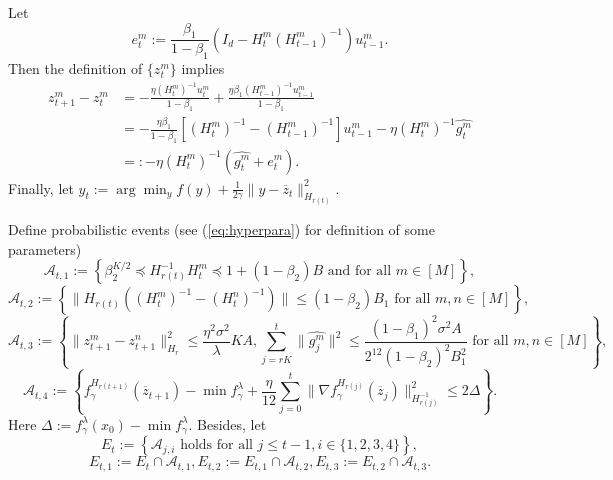 \documentclass{article} %
\numberwithin{equation}{section}
\renewcommand{\eqref}[1]{(\ref{#1})}
\begin{document}
    Let 
    \begin{equation}\label{eq:def_e}
        e_t^m:=\frac{\beta_1}{1-\beta_1}(I_d-H_t^m(H_{t-1}^m)^{-1})u_{t-1}^m.
    \end{equation}
    Then the definition of $\{z_t^m\}$ implies 
    \begin{equation}\label{eq:diff_zt}
        \begin{aligned}
            z_{t+1}^m-z_t^m 
            & = -\frac{\eta(H_t^m)^{-1}u_t^m}{1-\beta_1} + \frac{\eta\beta_1(H_{t-1}^m)^{-1}u_{t-1}^m}{1-\beta_1} \\
            & = -\frac{\eta\beta_1}{1-\beta_1}[(H_t^m)^{-1}-(H_{t-1}^m)^{-1}]u_{t-1}^m - \eta (H_t^m)^{-1}\widehat{g_t^m} \\
            & =: -\eta (H_t^m)^{-1}(\widehat{g_t^m}+e_t^m).
        \end{aligned}
    \end{equation}
    Finally, let $y_t:=\arg\min_y f(y) + \frac{1}{2\gamma}\|y-\overline{z}_t\|_{H_{r(t)}}^2$.
    
    Define probabilistic events (see \eqref{eq:hyperpara} for definition of some parameters)
    \begin{equation}
        \mathcal{A}_{t,1}:=\left\{ \beta_2^{K/2} \preceq H_{r(t)}^{-1}H_t^m \preceq 1+(1-\beta_2)B \text{ and for all }m\in [M] \right\},
    \end{equation}
    \begin{equation}
        \mathcal{A}_{t,2}:=\left\{ \|H_{r(t)}((H_t^m)^{-1}-(H_t^n)^{-1})\|\leq (1-\beta_2)B_1 \text{ for all }m,n\in [M] \right\},
    \end{equation}
    \begin{equation}
        \mathcal{A}_{t,3}:=\left\{ \|z_{t+1}^m-z_{t+1}^n\|_{H_r}^2 \leq \frac{\eta^2\sigma^2}{\lambda}KA, \sum_{j=rK}^{t}\|\widehat{g_j^m}\|^2\leq \frac{(1-\beta_1)^2\sigma^2A}{2^{12}(1-\beta_2)^2B_1^2} \text{ for all } m,n\in [M] \right\},
    \end{equation}
    \begin{equation}
        \mathcal{A}_{t,4}:=\left\{ f_\gamma^{H_{r(t+1)}}(\overline{z}_{t+1}) - \min f_\gamma^\lambda+\frac{\eta}{12}\sum_{j=0}^t\|\nabla f_\gamma^{H_{r(j)}}(\overline{z}_j)\|_{H_{r(j)}^{-1}}^2 \leq 2\Delta \right\}.
    \end{equation}
    Here $\Delta:= f_\gamma^\lambda(x_0)-\min f_\gamma^\lambda$. Besides, let 
    \begin{equation}
        E_t:= \left\{\mathcal{A}_{j,i} \text{ holds for all }j\leq t-1, i\in\{1,2,3,4\} \right\},
    \end{equation}
    \begin{equation}
        E_{t,1} := E_t \cap \mathcal{A}_{t,1}, E_{t,2} := E_{t,1} \cap \mathcal{A}_{t,2}, E_{t,3} := E_{t,2} \cap \mathcal{A}_{t,3}.
    \end{equation}
\end{document}
